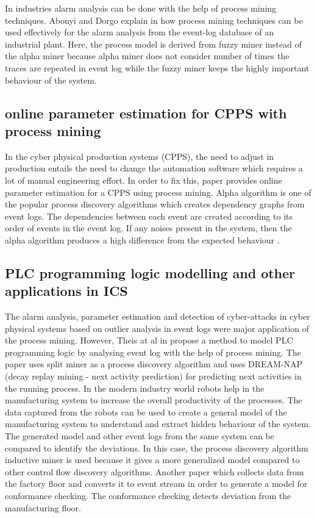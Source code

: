\documentclass[conference]{IEEEtran}
\begin{document}
In industries alarm analysis can be done with the help of process mining techniques.  Abonyi and Dorgo explain in \cite{paper4} how process mining techniques can be used effectively for the alarm analysis from the event-log database of an industrial plant. Here, the process model is derived from fuzzy miner instead of the alpha miner \cite{van2004workflow} because alpha miner does not consider number of times the traces are repeated in event log while the fuzzy miner keeps the highly important behaviour of the system.

\subsection{online parameter estimation for CPPS with process mining}

In the cyber physical production systems (CPPS), the need to adjust in production entails the need to change the automation software which requires a lot of manual engineering effort. In order to fix this, paper \cite{paper5} provides online parameter estimation for a CPPS  using process mining. Alpha algorithm is one of the popular process discovery algorithms which creates dependency graphs from event logs. The dependencies between each event are created according to its order of events in the event log. If any noises present in the system, then the alpha algorithm produces a high difference from the expected behaviour \cite{paper5}.

\subsection{PLC programming logic modelling and other applications in ICS }

The alarm analysis, parameter estimation and detection of cyber-attacks in cyber physical systems based on outlier analysis in event logs were major application of the process mining. However,  Theis at al in \cite{paper6} propose a method to model PLC programming logic by analysing event log with the help of process mining. The paper uses split miner as a process discovery algorithm and uses DREAM-NAP (decay replay mining - next activity prediction) for predicting next activities in the running process. In the modern industry world robots help in the manufacturing system to increase the overall productivity of the processes. The data captured from the robots can be used to create a general model of the manufacturing system to understand and extract hidden behaviour of the system. The generated model and other event logs from the same system can be compared to identify the deviations. In this case, the process discovery algorithm inductive miner is used because it gives a more generalized model compared to other control flow discovery algorithms. Another paper \cite{paper8} which collects data from the factory floor and converts it to event stream in order to generate a model for conformance checking. The conformance checking detects deviation from the manufacturing floor.
\end{document}
